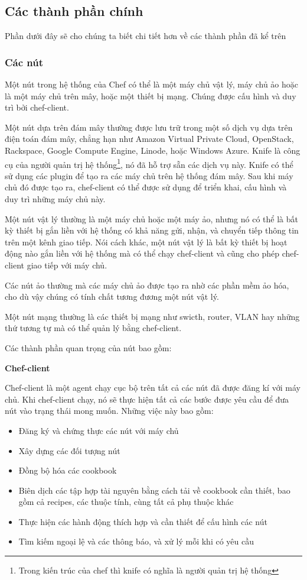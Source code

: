 \subsection{Các thành phần chính}
Phần dưới đây sẽ cho chúng ta biết chi tiết hơn về các thành phần đã kể trên

\subsubsection{Các nút}


Một nút trong hệ thống của Chef có thể là một máy chủ vật lý, máy chủ ảo hoặc là một máy chủ trên mây, hoặc một thiết bị mạng. Chúng được cấu hình và duy trì bởi chef-client.

Một nút dựa trên đám mây thường được lưu trữ trong một số dịch vụ dựa trên điện toán đám mây, chẳng hạn như Amazon Virtual Private Cloud, OpenStack, Rackspace, Google Compute Engine, Linode, hoặc Windows Azure. Knife là công cụ của người quản trị hệ thống\footnote{Trong kiến trúc của chef thì knife có nghĩa là người quản trị hệ thống}, nó đã hỗ trợ sẵn các dịch vụ này. Knife có thể sử dụng các plugin để tạo ra các máy chủ trên hệ thống đám mây. Sau khi máy chủ đó được tạo ra, chef-client có thể được sử dụng để triển khai, cấu hình và duy trì những máy chủ này.

Một nút vật lý thường là một máy chủ hoặc một máy ảo, nhưng nó có thể là bất kỳ thiết bị gắn liền với hệ thống có khả năng gửi, nhận, và chuyển tiếp thông tin trên một kênh giao tiếp. Nói cách khác, một nút vật lý là bất kỳ thiết bị hoạt động nào gắn liền với hệ thống mà có thể chạy chef-client và cũng cho phép chef-client giao tiếp với máy chủ.

Các nút ảo thường mà các máy chủ ảo được tạo ra nhờ các phần mềm ảo hóa, cho dù vậy chúng có tính chất tương đương một nút vật lý.

Một nút mạng thường là các thiết bị mạng như swicth, router, VLAN hay những thứ tương tự mà có thể quản lý bằng chef-client.

Các thành phần quan trọng của nút bao gồm:

\textbf{Chef-client}

Chef-client là một agent chạy cục bộ trên tất cả các nút đã được đăng kí với máy chủ. Khi chef-client chạy, nó sẽ thực hiện tất cả các bước được yêu cầu để đưa nút vào trạng thái mong muốn. Những việc này bao gồm:

\begin{itemize}
\item Đăng ký và chứng thực các nút với máy chủ
\item Xây dựng các đối tượng nút
\item Đồng bộ hóa các cookbook
\item Biên dịch các tập hợp tài nguyên bằng cách tải về cookbook cần thiết, bao gồm cả recipes, các thuộc tính, cùng tất cả phụ thuộc khác
\item Thực hiện các hành động thích hợp và cần thiết để cấu hình các nút
\item Tìm kiếm ngoại lệ và các thông báo, và xử lý mỗi khi có yêu cầu
\end{itemize}

